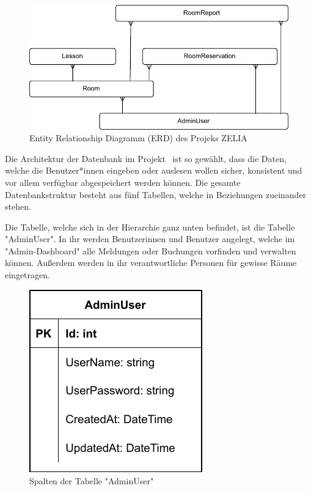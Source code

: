 
\begin{figure}[H]
    \centering
    \includegraphics{media/MariaDB/ERD.svg.pdf}
    \caption{Entity Relationship Diagramm (ERD) des Projeks ZELIA}
\end{figure}

Die Architektur der Datenbank im Projekt \ZELIA\ ist so gewählt, dass die Daten, welche die Benutzer*innen eingeben oder auslesen wollen sicher, konsistent und vor allem verfügbar abgespeichert werden können. Die gesamte Datenbankstruktur besteht aus fünf Tabellen, welche in Beziehungen zueinander stehen.


Die Tabelle, welche sich in der Hierarchie ganz unten befindet, ist die Tabelle "AdminUser". In ihr werden Benutzerinnen und Benutzer angelegt, welche im "Admin-Dashboard" alle Meldungen oder Buchungen vorfinden und verwalten können. Außerdem werden in ihr verantwortliche Personen für gewisse Räume eingetragen.

\begin{figure}[H]
    \centering
    \includegraphics{media/MariaDB/AdminUser.svg.pdf}
    \caption{Spalten der Tabelle "AdminUser"}
    \label{fig:AdminUserColls}
\end{figure}

